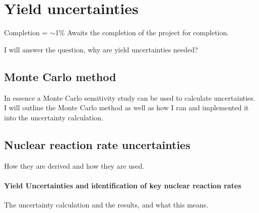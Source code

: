 \chapter{Yield uncertainties}

Completion = $\sim$1\%
Awaits the completion of the project for completion.

I will answer the question, why are yield uncertainties needed?

\section{Monte Carlo method}

In essence a Monte Carlo sensitivity study can be used to calculate uncertainties. I will outline the Monte Carlo method as well as how I ran and implemented it into the uncertainty calculation.

\section{Nuclear reaction rate uncertainties}

How they are derived and how they are used.

\subsubsection{Yield Uncertainties and identification of key nuclear reaction rates}

The uncertainty calculation and the results, and what this means.
